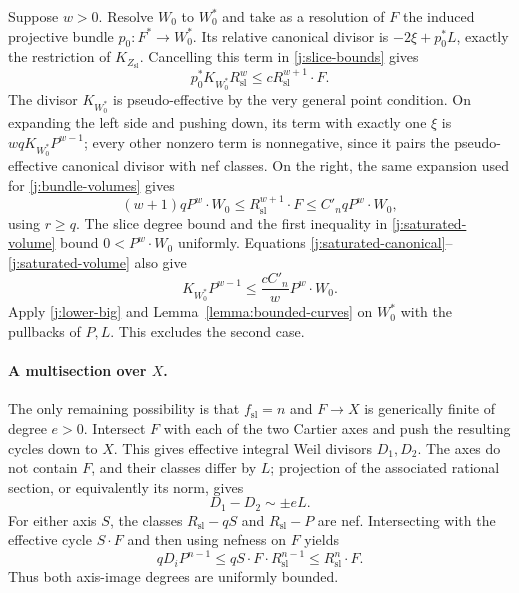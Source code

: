 Suppose $w>0$. Resolve $W_0$ to $W_0^*$ and take as a resolution
of $F$ the induced projective bundle
$p_0:F^*\to W_0^*$. Its relative canonical divisor is
$-2\xi+p_0^*L$, exactly the restriction of
$K_{Z_{\mathrm{sl}}}$. Cancelling this term in
\eqref{j:slice-bounds} gives
\begin{equation}\label{j:saturated-canonical}
 p_0^*K_{W_0^*}R_{\mathrm{sl}}^w
                   \le cR_{\mathrm{sl}}^{w+1}\cdot F.
\end{equation}
The divisor $K_{W_0^*}$ is pseudo-effective by the very general
point condition. On expanding the left side and pushing down, its
term with exactly one $\xi$ is
$wqK_{W_0^*}P^{w-1}$; every other nonzero term is nonnegative,
since it pairs the pseudo-effective canonical divisor with nef
classes. On the right, the same expansion used for
\eqref{j:bundle-volumes} gives
\begin{equation}\label{j:saturated-volume}
 (w+1)qP^w\cdot W_0
 \le R_{\mathrm{sl}}^{w+1}\cdot F
 \le C'_nqP^w\cdot W_0,
\end{equation}
using $r\ge q$. The slice degree bound and the first inequality in
\eqref{j:saturated-volume} bound $0<P^w\cdot W_0$ uniformly.
Equations \eqref{j:saturated-canonical}--\eqref{j:saturated-volume}
also give
\[
 K_{W_0^*}P^{w-1}\le\frac{cC'_n}{w}P^w\cdot W_0.
\]
Apply \eqref{j:lower-big} and Lemma~\ref{lemma:bounded-curves}
on $W_0^*$ with the pullbacks of $P,L$. This excludes the second
case.

\paragraph{A multisection over $X$.}
The only remaining possibility is that $f_{\mathrm{sl}}=n$ and
$F\to X$ is generically finite of degree $e>0$. Intersect $F$ with
each of the two Cartier axes and push the resulting cycles down
to $X$. This gives effective integral Weil divisors $D_1,D_2$.
The axes do not contain $F$, and their classes differ by $L$;
projection of the associated rational section, or equivalently its
norm, gives
\begin{equation}\label{j:signed-L}
                         D_1-D_2\sim\pm eL.
\end{equation}
For either axis $S$, the classes $R_{\mathrm{sl}}-qS$ and
$R_{\mathrm{sl}}-P$ are nef. Intersecting with the effective cycle
$S\cdot F$ and then using nefness on $F$ yields
\begin{equation}\label{j:axis-degrees}
 qD_iP^{n-1}\le qS\cdot F\cdot R_{\mathrm{sl}}^{n-1}
                  \le R_{\mathrm{sl}}^n\cdot F.
\end{equation}
Thus both axis-image degrees are uniformly bounded.

